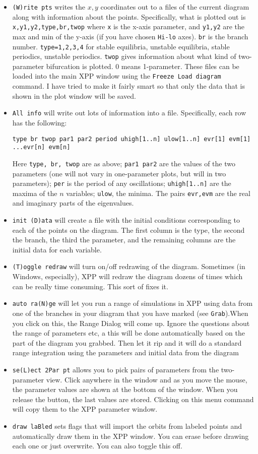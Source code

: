 \documentclass{article}
\begin{document}
\begin{itemize}
\begin{itemize}
\item {\tt (W)rite pts} writes the $x,y$ coordinates out to a files of the current diagram along with information about the points. Specifically, what is plotted out is {\tt x,y1,y2,type,br,twop} where {\tt x} is the x-axis parameter, and {\tt y1,y2} are the max and min of the y-axis (if you have chosen {\tt Hi-lo} axes). {\tt br} is the branch number. {\tt type=1,2,3,4} for stable equilibria, unstable equilibria, stable periodics, unstable periodics.  {\tt twop} gives information about what kind of two-parameter bifurcation is plotted. 0 means 1-parameter. These files can be loaded into the main XPP window using the {\tt Freeze Load diagram} command. I have tried to make it fairly smart so that only the data that is shown in the plot window will be saved.
\item {\tt All info} will write out lots of information into a file. Specifically, each row has the following:
\begin{verbatim}
type br twop par1 par2 period uhigh[1..n] ulow[1..n] evr[1] evm[1] ...evr[n] evm[n]
\end{verbatim} 
Here {\tt type, br, twop} are as above; {\tt par1 par2} are the values of the two parameters (one will not vary in one-parameter plots, but will in two parameters); {\tt per} is the period of any oscillations; {\tt uhigh[1..n]} are the maxima of the $n$ variables; {\tt ulow}, the minima. The pairs {\tt evr,evm} are the real and imaginary parts of the eigenvalues.
\item {\tt init (D)ata} will create a file with the initial conditions corresponding to each of the points on the diagram. The first column is the type, the second the branch, the third the parameter, and the remaining columns are the initial data for each variable.
\item {\tt (T)oggle redraw} will turn on/off redrawing of the diagram. Sometimes (in Windows, especially), XPP will redraw the diagram dozens of times which can be really time consuming. This sort of fixes it.
\item {\tt auto ra(N)ge} will let you run a range of simulations in XPP using data from one of the branches in your diagram that you have marked (see {\tt Grab}).When you click on this, the Range Dialog will come up. Ignore the questions about the range of parameters etc, a this will be done automatically based on the part of the diagram you grabbed. Then let it rip and it will do a standard range integration using the parameters and initial data from the diagram   
\item {\tt se(L)ect 2Par pt} allows you to pick pairs of parameters from the two-parameter view. Click anywhere in the window and as you move the mouse, the parameter values are shown at the bottom of the window. When you release the button, the last values are stored. Clicking on this menu command will copy them to the XPP parameter window.
\item {\tt draw laBled} sets flags that will import the orbits from labeled points and automatically draw them in the XPP window. You can erase before drawing each one or just overwrite. You can also toggle this off. 
\end{itemize}


\end{itemize}
\end{document}
